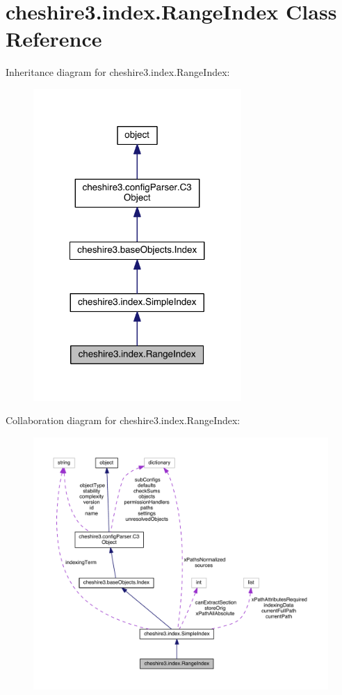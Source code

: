 \hypertarget{classcheshire3_1_1index_1_1_range_index}{\section{cheshire3.\-index.\-Range\-Index Class Reference}
\label{classcheshire3_1_1index_1_1_range_index}
}


Inheritance diagram for cheshire3.\-index.\-Range\-Index\-:
\nopagebreak
\begin{figure}[H]
\begin{center}
\leavevmode
\includegraphics[width=224pt]{classcheshire3_1_1index_1_1_range_index__inherit__graph}
\end{center}
\end{figure}


Collaboration diagram for cheshire3.\-index.\-Range\-Index\-:
\nopagebreak
\begin{figure}[H]
\begin{center}
\leavevmode
\includegraphics[width=350pt]{classcheshire3_1_1index_1_1_range_index__coll__graph}
\end{center}
\end{figure}
